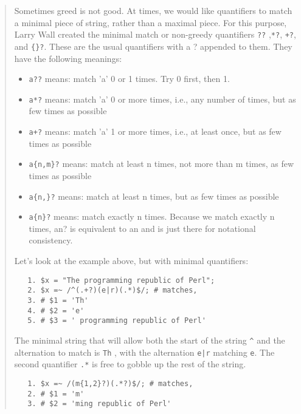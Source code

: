 \begin{it}
\begin{quotation}
Sometimes greed is not good. At times, we would like quantifiers to match
a minimal piece of string, rather than a maximal piece. For this purpose,
Larry Wall created the minimal match or non-greedy quantifiers \verb|??| ,\verb|*?|, \verb|+?|, and \verb|{}?|. 
These are the usual quantifiers with a ? appended to
them. They have the following meanings:


\begin{itemize}
   \item
      \verb|a??| means: match 'a' 0 or 1 times. Try 0 first, then 1.
    \item

      \verb|a*?| means: match 'a' 0 or more times, i.e., any number of times, but as few times as possible
    \item

      \verb|a+?| means: match 'a' 1 or more times, i.e., at least once, but as few times as possible
    \item

      \verb|a{n,m}?| means: match at least n times, not more than m times, as few times as possible
    \item

      \verb|a{n,}?| means: match at least n times, but as few times as possible
    \item

      \verb|a{n}?| means: match exactly n times. Because we match exactly n times, a{n}? is equivalent to a{n} and is just there for notational consistency.
\end{itemize}

Let's look at the example above, but with minimal quantifiers:

\begin{verbatim}
   1. $x = "The programming republic of Perl";
   2. $x =~ /^(.+?)(e|r)(.*)$/; # matches,
   3. # $1 = 'Th'
   4. # $2 = 'e'
   5. # $3 = ' programming republic of Perl'
\end{verbatim}

The minimal string that will allow both the start of the string \verb|^| and
the alternation to match is \verb|Th| , with the alternation \verb#e|r# matching \verb|e|. 
The second quantifier \verb|.*| is free to gobble up the rest of the string.

\begin{verbatim}
   1. $x =~ /(m{1,2}?)(.*?)$/; # matches,
   2. # $1 = 'm'
   3. # $2 = 'ming republic of Perl'
\end{verbatim}


\end{quotation}
\end{it}
